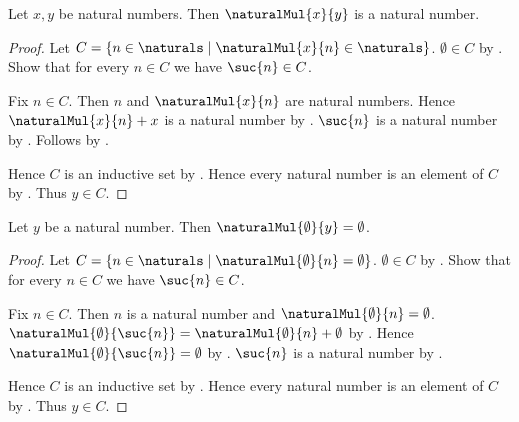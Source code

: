 \begin{theorem}\label{natural_multiplication_closed}
    Let $x,y$ be natural numbers.
    Then $\naturalMul{x}{y}$ is a natural number.
\end{theorem}
\begin{proof}
    Let $C=\{n\in\naturals\mid
        \naturalMul{x}{n}\in\naturals\}$.
    $\emptyset\in C$
        by .
    Show that for every $n\in C$ we have $\suc{n}\in C$.
    \begin{subproof}
        Fix $n\in C$.
        Then $n$ and $\naturalMul{x}{n}$ are natural numbers.
        Hence $\naturalMul{x}{n}+x$ is a natural number
            by .
        $\suc{n}$ is a natural number by .
        Follows by
            .
    \end{subproof}
    Hence $C$ is an inductive set by .
    Hence every natural number is an element of $C$
        by .
    Thus $y\in C$.
\end{proof}

\begin{proposition}\label{natural_multiplication_zero_left}
    Let $y$ be a natural number.
    Then $\naturalMul{\emptyset}{y}=\emptyset$.
\end{proposition}
\begin{proof}
    Let $C=\{n\in\naturals\mid
        \text{$\naturalMul{\emptyset}{n}=\emptyset$}\}$.
    $\emptyset\in C$
        by .
    Show that for every $n\in C$ we have $\suc{n}\in C$.
    \begin{subproof}
        Fix $n\in C$.
        Then $n$ is a natural number and
            $\naturalMul{\emptyset}{n}=\emptyset$.
        $\naturalMul{\emptyset}{\suc{n}}
            =\naturalMul{\emptyset}{n}+\emptyset$
            by .
        Hence $\naturalMul{\emptyset}{\suc{n}}=\emptyset$
            by .
        $\suc{n}$ is a natural number by .
    \end{subproof}
    Hence $C$ is an inductive set by .
    Hence every natural number is an element of $C$
        by .
    Thus $y\in C$.
\end{proof}

